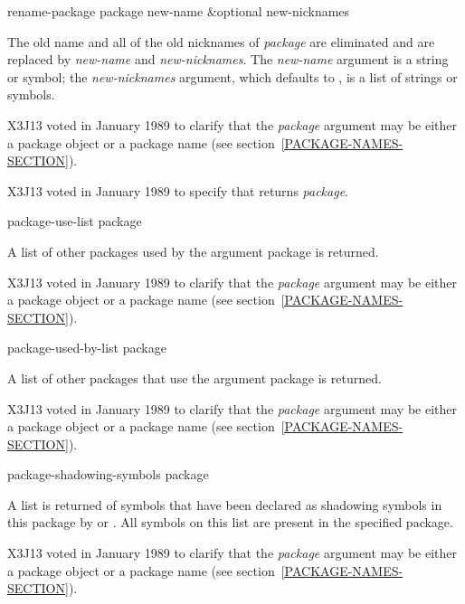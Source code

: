 \begin{defun}[Function]
rename-package package new-name &optional new-nicknames

The old name and all of the old nicknames of {\it package} are eliminated
and are replaced by {\it new-name} and {\it new-nicknames}.  The
{\it new-name} argument is a string or symbol; the {\it new-nicknames}
argument, which defaults to {\false}, is a list of strings or symbols.

\begin{new}
X3J13 voted in January 1989
to clarify that the {\it package} argument may be either a package object
or a package name (see section~\ref{PACKAGE-NAMES-SECTION}).
\end{new}

\begin{new}
X3J13 voted in January 1989
to specify that  returns {\it package}.
\end{new}
\end{defun}

\begin{defun}[Function]
package-use-list package

A list of other packages used by the argument package is returned.

\begin{new}
X3J13 voted in January 1989
to clarify that the {\it package} argument may be either a package object
or a package name (see section~\ref{PACKAGE-NAMES-SECTION}).
\end{new}
\end{defun}

\begin{defun}[Function]
package-used-by-list package

A list of other packages that use the argument package is returned.

\begin{new}
X3J13 voted in January 1989
to clarify that the {\it package} argument may be either a package object
or a package name (see section~\ref{PACKAGE-NAMES-SECTION}).
\end{new}
\end{defun}

\begin{defun}[Function]
package-shadowing-symbols package

A list is returned of symbols that have been declared as shadowing
symbols in this package by  or .  All
symbols on this list are present in the specified package.

\begin{new}
X3J13 voted in January 1989
to clarify that the {\it package} argument may be either a package object
or a package name (see section~\ref{PACKAGE-NAMES-SECTION}).
\end{new}
\end{defun}

